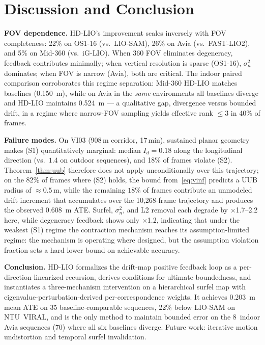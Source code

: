 \documentclass[conference]{IEEEtran}
\begin{document}
\section{Discussion and Conclusion}\label{sec:discussion}

\textbf{FOV dependence.} HD-LIO's improvement scales inversely with FOV
completeness: 22\% on OS1-16 (vs.\ LIO-SAM), 26\% on Avia (vs.\
FAST-LIO2), and 5\% on Mid-360 (vs.\ iG-LIO). When 360\textdegree{}
FOV eliminates degeneracy, feedback contributes minimally; when
vertical resolution is sparse (OS1-16), $\sigma^2_n$ dominates; when
FOV is narrow (Avia), both are critical. The indoor paired comparison
corroborates this regime separation: Mid-360 HD-LIO matches baselines
(\SI{0.150}{\meter}), while on Avia in the \emph{same} environments
all baselines diverge and HD-LIO maintains \SI{0.524}{\meter} — a
qualitative gap, divergence versus bounded drift, in a regime where
narrow-FOV sampling yields effective rank $\le 3$ in 40\% of frames.

\textbf{Failure modes.}
On VI03 (908\,m corridor, 17\,min), sustained planar geometry makes
(S1) quantitatively marginal: median $I_d{=}0.18$ along the
longitudinal direction (vs.\ $1.4$ on outdoor sequences), and 18\% of
frames violate (S2). Theorem~\ref{thm:uub} therefore does not apply
unconditionally over this trajectory; on the $82\%$ of frames where
(S2) holds, the bound from~\eqref{eq:vinf} predicts a UUB radius of
${\approx}0.5$\,m, while the remaining $18\%$ of frames contribute an
unmodeled drift increment that accumulates over the 10{,}268-frame
trajectory and produces the observed
\SI{0.608}{\meter} ATE. Surfel, $\sigma^2_n$, and L2 removal each
degrade by $\times$1.7--2.2 here, while degeneracy feedback shows
only $\times$1.2, indicating that under the weakest (S1) regime the
contraction mechanism reaches its assumption-limited regime: the
mechanism is operating where designed, but the assumption violation
fraction sets a hard lower bound on achievable accuracy.

\textbf{Conclusion.}
HD-LIO formalizes the drift-map positive feedback loop as a
per-direction linearized recursion, derives conditions for ultimate
boundedness, and instantiates a three-mechanism intervention on a
hierarchical surfel map with eigenvalue-perturbation-derived
per-correspondence weights. It achieves \SI{0.203}{\meter} mean ATE on
35 baseline-comparable sequences, 22\% below LIO-SAM on NTU~VIRAL, and
is the only method to maintain bounded error on the 8~indoor Avia
sequences (70\textdegree{}) where all six baselines diverge.
Future work: iterative motion undistortion and temporal surfel
invalidation.

\footnotesize


\end{document}
